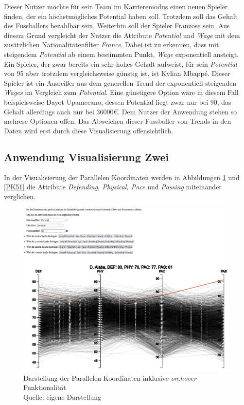 \documentclass[usegeometry=true]{scrartcl}
\begin{document}
Dieser Nutzer möchte für sein Team im Karrieremodus einen neuen Spieler finden, der ein höchstmögliches Potential haben soll. Trotzdem soll das Gehalt des Fussballers bezahlbar sein. Weiterhin soll der Spieler Franzose sein. Aus diesem Grund vergleicht der Nutzer die Attribute \textit{Potential} und \textit{Wage} mit dem zusätzlichen Nationalitätenfilter \textit{France}. Dabei ist zu erkennen, dass mit steigendem \textit{Potential} ab einem bestimmten Punkt, \textit{Wage} exponentiell ansteigt. Ein Spieler, der zwar bereits ein sehr hohes Gehalt aufweist, für sein \textit{Potential} von 95 aber trotzdem vergleichsweise günstig ist, ist Kylian Mbappé. Dieser Spieler ist ein Ausreißer aus dem generellen Trend der exponentiell steigenden \textit{Wages} im Vergleich zum \textit{Potential}. Eine günstigere Option wäre in diesem Fall beispielsweise Dayot Upamecano, dessen Potential liegt zwar nur bei 90, das Gehalt allerdings auch nur bei 36000€. Dem Nutzer der Anwendung stehen so mehrere Optionen offen. Das Abweichen dieser Fussballer von Trends in den Daten wird erst durch diese Visualisierung offensichtlich.

\subsection{Anwendung Visualisierung Zwei}
In der Visualisierung der Parallelen Koordinaten werden in Abbildungen \ref{PK5} und \ref{PK51} die Attribute \textit{Defending, Physical, Pace} und \textit{Passing} miteinander verglichen.\\
\begin{figure}[h!]
\centering
\includegraphics[scale=0.58]{grafiken/ParalleleKoordinaten5}
\caption{Darstellung der Parallelen Koordinaten inklusive \textit{on:hover} Funktionalität\\ Quelle: eigene Darstellung}
\label{PK5}
\end{figure}
\end{document}
